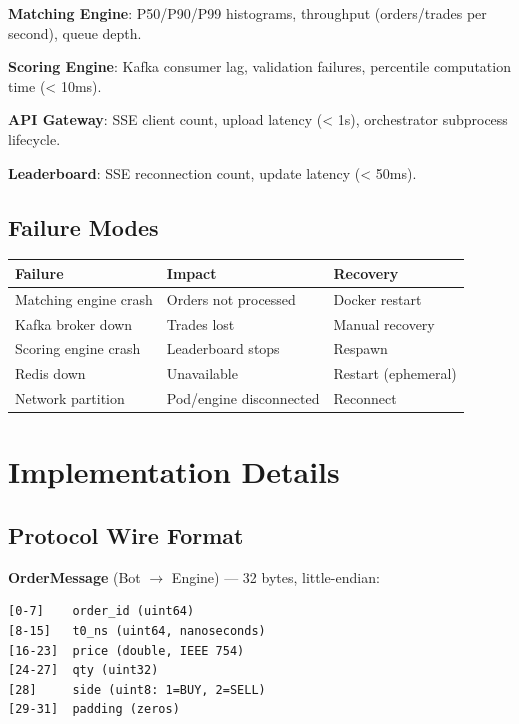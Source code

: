 \documentclass[10pt,a4paper,oneside]{report}
\begin{document}
\textbf{Matching Engine}: P50/P90/P99 histograms, throughput (orders/trades per second), queue depth.

\textbf{Scoring Engine}: Kafka consumer lag, validation failures, percentile computation time (< 10ms).

\textbf{API Gateway}: SSE client count, upload latency (< 1s), orchestrator subprocess lifecycle.

\textbf{Leaderboard}: SSE reconnection count, update latency (< 50ms).

\section{Failure Modes}

\begin{table}[H]\tiny
    \centering
    \begin{tabular}{lll}
    \toprule
    \textbf{Failure} & \textbf{Impact} & \textbf{Recovery} \\
    \midrule
    Matching engine crash & Orders not processed & Docker restart \\
    Kafka broker down & Trades lost & Manual recovery \\
    Scoring engine crash & Leaderboard stops & Respawn \\
    Redis down & Unavailable & Restart (ephemeral) \\
    Network partition & Pod/engine disconnected & Reconnect \\
    \bottomrule
    \end{tabular}
\end{table}

\chapter{Implementation Details}

\section{Protocol Wire Format}

\textbf{OrderMessage} (Bot $\rightarrow$ Engine) — 32 bytes, little-endian:
\begin{lstlisting}
[0-7]    order_id (uint64)
[8-15]   t0_ns (uint64, nanoseconds)
[16-23]  price (double, IEEE 754)
[24-27]  qty (uint32)
[28]     side (uint8: 1=BUY, 2=SELL)
[29-31]  padding (zeros)
\end{lstlisting}
\end{document}

